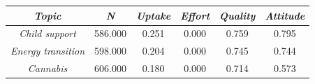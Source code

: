 \begin{tabular}{c c c c c c}
      \hline
      \textit{Topic} & \textit{N} & \textit{Uptake} & \textit{Effort} & \textit{Quality} & \textit{Attitude} \\
      \hline
      \textit{Child support} & 586.000 & 0.251 & 0.000 & 0.759 & 0.795 \\
      \textit{Energy transition} & 598.000 & 0.204 & 0.000 & 0.745 & 0.744 \\
      \textit{Cannabis} & 606.000 & 0.180 & 0.000 & 0.714 & 0.573 \\
      \hline
    \end{tabular}
